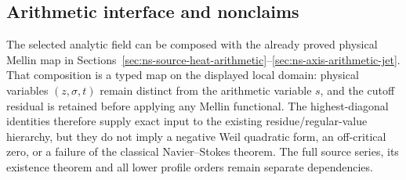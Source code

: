\subsection{Arithmetic interface and nonclaims}

The selected analytic field can be composed with the already proved physical
Mellin map in Sections~\ref{sec:ns-source-heat-arithmetic}--\ref{sec:ns-axis-arithmetic-jet}.
That composition is a typed map on the displayed local domain: physical
variables $(z,\sigma,t)$ remain distinct from the arithmetic variable $s$,
and the cutoff residual is retained before applying any Mellin functional.
The highest-diagonal identities therefore supply exact input to the existing
residue/regular-value hierarchy, but they do not imply a negative Weil
quadratic form, an off-critical zero, or a failure of the classical
Navier--Stokes theorem.  The full source series, its existence theorem and
all lower profile orders remain separate dependencies.
